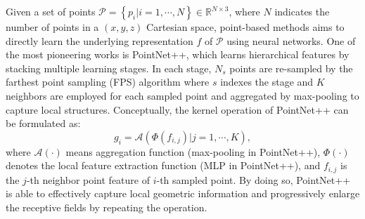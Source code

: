 Given a set of points $\mathcal{P}=\left \{ p_i|i=1,\cdots, N \right \}\in\mathbb{R}^{N\times3}$, where $N$ indicates the number of points in a  $\left(x, y, z\right)$ Cartesian space, point-based methods aims to directly learn the underlying representation $f$ of $\mathcal{P}$ using neural networks. One of the most pioneering works is PointNet++, which learns hierarchical features by stacking multiple learning stages. In each stage, $N_s$ points are re-sampled by the farthest point sampling (FPS) algorithm where $s$ indexes the stage and $K$ neighbors are employed for each sampled point and aggregated by max-pooling to capture local structures. Conceptually, the kernel operation of PointNet++ can be formulated as:
\begin{equation}
    g_i = \mathcal{A}\left(\Phi\left(f_{i,j}\right)|  j =1,\cdots, K\right),
\end{equation}
where $\mathcal{A}\left(\cdot\right)$ means aggregation function (max-pooling in PointNet++), $\Phi\left(\cdot\right)$ denotes the local feature extraction function (MLP in PointNet++), and $f_{i,j}$ is the $j$-th neighbor point feature of $i$-th sampled point. By doing so, PointNet++ is able to effectively capture local geometric information and progressively enlarge the receptive fields by repeating the operation.

